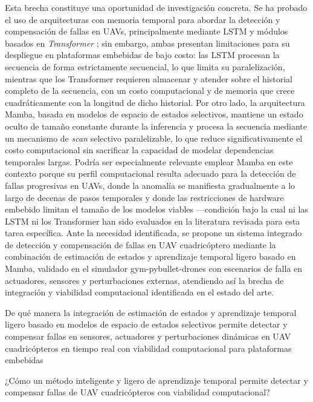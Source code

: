 \noindent Esta brecha constituye una oportunidad de investigación 
concreta. Se ha probado el uso de arquitecturas con memoria 
temporal para abordar la detección y compensación de fallas en 
UAVs, principalmente mediante LSTM \cite{ozcan2024, li2021} y 
módulos basados en \textit{Transformer} \cite{kim2025, giral2024}; 
sin embargo, ambas presentan limitaciones para su despliegue en 
plataformas embebidas de bajo costo: las LSTM procesan la secuencia 
de forma estrictamente secuencial, lo que limita su 
paralelización, mientras que los Transformer requieren almacenar y 
atender sobre el historial completo de la secuencia, con un costo 
computacional y de memoria que crece cuadráticamente con la 
longitud de dicho historial. Por otro lado, la arquitectura Mamba, 
basada en modelos de espacio de estados selectivos, mantiene un 
estado oculto de tamaño constante durante la inferencia y procesa 
la secuencia mediante un mecanismo de \textit{scan} selectivo 
paralelizable, lo que reduce significativamente el costo 
computacional sin sacrificar la capacidad de modelar dependencias 
temporales largas. Podría ser especialmente relevante emplear Mamba 
en este contexto porque su perfil computacional resulta adecuado 
para la detección de fallas progresivas en UAVs, donde la anomalía 
se manifiesta gradualmente a lo largo de decenas de pasos 
temporales y donde las restricciones de hardware embebido limitan 
el tamaño de los modelos viables —condición bajo la cual ni las 
LSTM ni los Transformer han sido evaluados en la literatura 
revisada para esta tarea específica. Ante la necesidad identificada, 
se propone un sistema integrado de detección y compensación de 
fallas en UAV cuadricóptero mediante la combinación de estimación 
de estados y aprendizaje temporal ligero basado en Mamba, validado 
en el simulador gym-pybullet-drones con escenarios de falla en 
actuadores, sensores y perturbaciones externas, atendiendo así la 
brecha de integración y viabilidad computacional identificada en el 
estado del arte.





De qué manera la integración de estimación de estados 
y aprendizaje temporal ligero basado en modelos de espacio de 
estados selectivos permite detectar y compensar fallas en sensores, 
actuadores y perturbaciones dinámicas en UAV cuadricópteros en 
tiempo real con viabilidad computacional para plataformas embebidas


¿Cómo un método inteligente y ligero de aprendizaje temporal permite detectar y compensar fallas de UAV cuadricópteros con viabilidad computacional?


